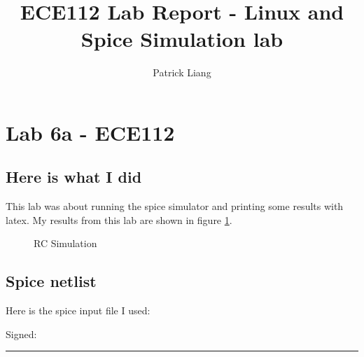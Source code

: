 \documentclass[11pt, oneside]{article}
\title{\vspace{-3.0cm}ECE112 Lab Report - Linux and Spice Simulation lab}
\author{Patrick Liang}
\newcommand{\uline}[1]{\rule[0pt]{#1}{0.4pt}}%
\begin{document}
\maketitle

\section*{Lab 6a - ECE112}

\subsection*{Here is what I did}
 
This lab was about running the spice simulator and printing some results
with latex. My results from this lab are shown in figure \ref{fig:simplot}.

\begin{figure}[H]
\center
{}
\caption{\label{fig:simplot}RC Simulation}
\end{figure}

\subsection*{Spice netlist}

Here is the spice input file I used:
\vspace{3mm}


\vspace{3mm}
Signed: \hspace{1mm}
\uline{1.5in} \vspace{0.2in} \\
\end{document}
